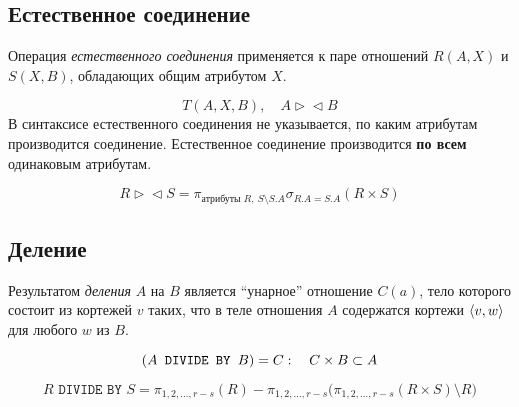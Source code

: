 \subsection*{Естественное соединение}

Операция \emph{естественного соединения} применяется к паре отношений $ R(A, X) $ и $ S(X, B) $, обладающих общим атрибутом $ X $.

$$ T(A, X, B), \quad A \vartriangleright\vartriangleleft B $$
В синтаксисе естественного соединения не указывается, по каким атрибутам производится соединение.
Естественное соединение производится \textbf{по всем} одинаковым атрибутам.

$$ R \vartriangleright\vartriangleleft S = \pi_{\text{атрибуты } R, ~ S \setminus S.A} \sigma_{R.A = S.A}(R \times S) $$

\subsection*{Деление}

\begin{definition}
	Результатом \emph{деления} $ A $ на $ B $ является ``унарное'' отношение $ C(a) $, тело которого состоит из кортежей $ v $ таких, что в теле отношения $ A $ содержатся кортежи $ \Braket{v, w} $ для любого $ w $ из $ B $.
\end{definition}

$$ (A \texttt{ DIVIDE BY } B) = C : \quad C \times B \subset A $$

$$ R \texttt{ DIVIDE BY } S = \pi_{1, 2, \dots, r - s}(R) - \pi_{1, 2, \dots, r - s} \bigl( \pi_{1, 2, \dots, r - s}(R \times S) \setminus R \bigr) $$

